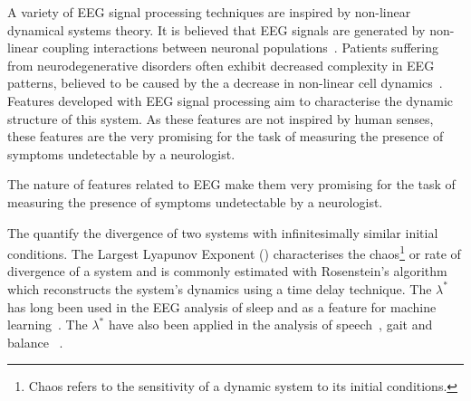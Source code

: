 \documentclass[12pt, twoside]{book}
\renewcommand\emph[1]{\textit{\color{USred}{#1}}}
\begin{document}
A variety of EEG signal processing techniques are inspired by non-linear dynamical systems theory. It is believed that EEG signals are generated by non-linear coupling interactions between neuronal populations~\cite{eegalzheimers}. Patients suffering from neurodegenerative disorders often exhibit decreased complexity in EEG patterns, believed to be caused by the a decrease in  non-linear cell dynamics~\cite{jelles1999decrease}. Features developed with EEG signal processing aim to characterise the dynamic structure of this system. As these features are not inspired by human senses, these features are the very promising for the task of measuring the presence of symptoms undetectable by a neurologist. 

\begin{highlight}
The nature of features related to EEG make them very promising for the task of measuring the presence of symptoms undetectable by a neurologist.
\end{highlight}

The \emph{Lyapunov Exponents} quantify the divergence of two systems with infinitesimally similar initial conditions. The Largest Lyapunov Exponent (\emph{$\lambda^*$}) characterises the chaos\footnote{Chaos refers to the sensitivity of a dynamic system to its initial conditions.} or rate of divergence of a system and is commonly estimated with Rosenstein's algorithm~\cite{rosenstein1993practicallyapunov} which reconstructs the system's dynamics using a time delay technique. The $\lambda^*$ has long been used in the EEG analysis of sleep and as a feature for machine learning~\cite{eeglyapunov1, eeglyapunov2}. The $\lambda^*$ have also been applied in the analysis of speech~\cite{banbrook1999speechlyapunov,kokkinos2005nonlinearlyapunov}, gait and balance ~\cite{dingwell2000nonlinearlyapunov, howcroft2014analysisgaitlyapunov, liu2015analysislyapunov}.


\end{document}
